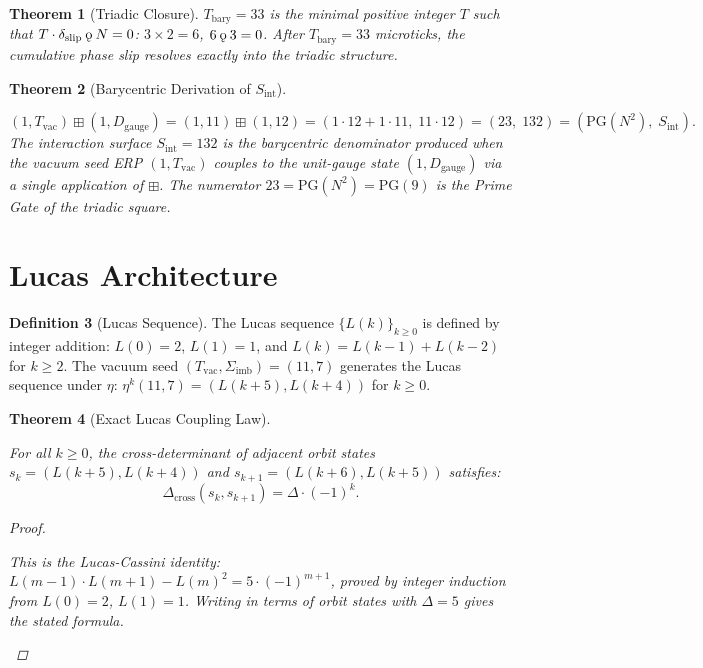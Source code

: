 \documentclass[11pt,letterpaper]{article}
\theoremstyle{plain}
\newtheorem{theorem}{Theorem}[section]
\theoremstyle{definition}
\newtheorem{definition}[theorem]{Definition}
\theoremstyle{remark}
\newcommand{\aop}{\eta}
\newcommand{\bplus}{\boxplus}
\newcommand{\Dcross}{\Delta_{\mathrm{cross}}}
\newcommand{\koppa}{\mathbin{\text{\rm\k{o}}}}
\newcommand{\Tbary}{T_{\mathrm{bary}}}
\newcommand{\Dg}{D_{\mathrm{gauge}}}
\newcommand{\Sint}{S_{\mathrm{int}}}
\newcommand{\Sigimb}{\Sigma_{\mathrm{imb}}}
\newcommand{\PG}{\mathrm{PG}}
\newcommand{\dslip}{\delta_{\mathrm{slip}}}
\newcommand{\Tvac}{T_{\mathrm{vac}}}
\begin{document}
\begin{theorem}[Triadic Closure]\label{thm:tbary}
$\Tbary=33$ is the minimal positive integer $T$ such that
$T\cdot\dslip\koppa N=0$:
$3\times2=6$, $6\koppa3=0$.
After $\Tbary=33$ microticks, the cumulative phase slip resolves
exactly into the triadic structure.
\end{theorem}

\begin{theorem}[Barycentric Derivation of $\Sint$]\label{thm:sint-bary}
\begin{rsbox}
\[
(1,\Tvac)\bplus(1,\Dg)=(1,11)\bplus(1,12)
=(1\cdot12+1\cdot11,\;11\cdot12)=(23,\;132)=(\PG(N^2),\;\Sint).
\]
The interaction surface $\Sint=132$ is the barycentric denominator
produced when the vacuum seed ERP $(1,\Tvac)$ couples to the
unit-gauge state $(1,\Dg)$ via a single application of $\bplus$.
The numerator $23=\PG(N^2)=\PG(9)$ is the Prime Gate of the triadic
square.
\end{rsbox}
\end{theorem}

\section{Lucas Architecture}\label{sec:lucas}


\begin{definition}[Lucas Sequence]\label{def:lucas}
The Lucas sequence $\{L(k)\}_{k\geq0}$ is defined by integer
addition: $L(0)=2$, $L(1)=1$, and $L(k)=L(k-1)+L(k-2)$ for
$k\geq2$.  The vacuum seed $(\Tvac,\Sigimb)=(11,7)$ generates the
Lucas sequence under $\aop$: $\aop^k(11,7)=(L(k+5),L(k+4))$ for
$k\geq0$.
\end{definition}

\begin{theorem}[Exact Lucas Coupling Law]\label{thm:lcc}
\begin{rsbox}
For all $k\geq0$, the cross-determinant of adjacent orbit states
$s_k=(L(k+5),L(k+4))$ and $s_{k+1}=(L(k+6),L(k+5))$ satisfies:
\[
\Dcross(s_k,s_{k+1}) = \Delta\cdot(-1)^k.
\]
\end{rsbox}
\begin{proof}
\begin{rsbox}
This is the Lucas-Cassini identity:
$L(m-1)\cdot L(m+1)-L(m)^2=5\cdot(-1)^{m+1}$, proved by integer
induction from $L(0)=2$, $L(1)=1$.  Writing in terms of orbit
states with $\Delta=5$ gives the stated formula.
\end{rsbox}
\end{proof}
\end{theorem}
\end{document}
